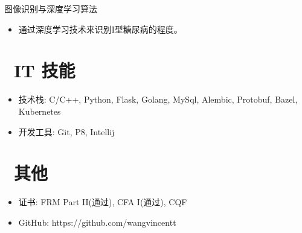 \documentclass{resume}
\begin{document}
\begin{onehalfspacing}
图像识别与深度学习算法
\begin{itemize}
  \item 通过深度学习技术来识别I型糖尿病的程度。
\end{itemize}
\end{onehalfspacing}


\section{\faCogs\ IT 技能}
\begin{itemize}[parsep=0.5ex]
  \item 技术栈: C/C++, Python, Flask, Golang, MySql, Alembic, Protobuf, Bazel, Kubernetes
  \item 开发工具: Git, P8, Intellij
\end{itemize}

\section{\faInfo\ 其他}
\begin{itemize}[parsep=0.5ex]
  \item 证书: FRM Part II(通过), CFA I(通过), CQF
  \item GitHub: https://github.com/wangvincentt
\end{itemize}

%
%
\end{document}

